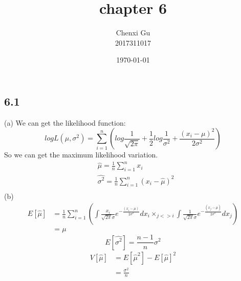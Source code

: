 \documentclass{article}
\begin{document}
\begin{CJK*}{GBK}{song}

\pagestyle{fancy}  
\fancyhead{} %
\renewcommand{\headrulewidth}{0.4pt}  
\renewcommand{\footrulewidth}{0.4pt} 



\title {chapter 6}
\author{Chenxi Gu\\2017311017}

\date{\today}

\maketitle

\section{6.1}
(a)
We can get the likelihood function: 
\begin{equation}
logL(\mu,\sigma^2)=\sum_{i=1}^n(log\frac{1}{\sqrt{2\pi}}+\frac{1}{2}log\frac{1}{\sigma^2}+\frac{(x_i-\mu)^2}{2\sigma^2})
\end{equation}
So we can get the maximum likelihood variation.
\begin{equation}
\begin{aligned}
&\hat{\mu}=\frac{1}{n}\sum_{i=1}^nx_i\\
&\hat{\sigma^2}=\frac{1}{n}\sum_{i=1}^n(x_i-\hat{\mu})^2\\
\end{aligned}
\end{equation}
(b)
\begin{equation}
\begin{aligned}
E[\hat{\mu}]&=\frac{1}{n}\sum_{i=1}^n(\int\frac{x_i}{\sqrt{2\pi}\sigma}e^{-\frac{(x_i-\mu)}{2\sigma^2}}dx_i\times_{j<>i}\int\frac{1}{\sqrt{2\pi}\sigma}e^{-\frac{(x_j-\mu)}{2\sigma^2}}dx_j )\\
&=\mu
\end{aligned}
\end{equation}
\begin{equation}
E[\hat{\sigma^2}]=\frac{n-1}{n}\sigma^2
\end{equation}
\begin{equation}
\begin{aligned}
V[\hat{\mu}]&=E[\hat{\mu}^2]-E[\hat{\mu}]^2\\
&=\frac{\sigma^2}{n}
\end{aligned}

\end{equation}
\end{CJK*}
\end{document}
